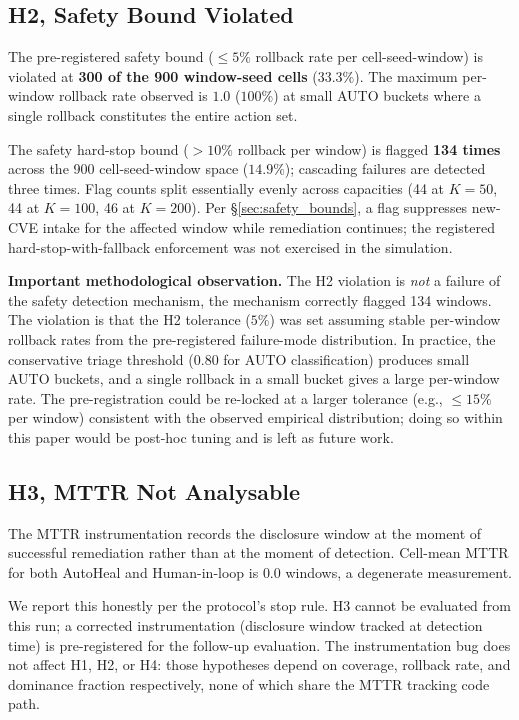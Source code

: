 \subsection{H2, Safety Bound Violated}

The pre-registered safety bound ($\leq 5\%$ rollback rate per
cell-seed-window) is violated at \textbf{300 of the 900
window-seed cells} ($33.3\%$). The maximum per-window rollback
rate observed is $1.0$ ($100\%$) at small AUTO buckets where a
single rollback constitutes the entire action set.

The safety hard-stop bound ($> 10\%$ rollback per window) is
flagged \textbf{134 times} across the 900 cell-seed-window space
($14.9\%$); cascading failures are detected three times.
Flag counts split essentially evenly across capacities (44 at $K = 50$,
44 at $K = 100$, 46 at $K = 200$). Per \S\ref{sec:safety_bounds},
a flag suppresses new-CVE intake for the affected window while
remediation continues; the registered hard-stop-with-fallback
enforcement was not exercised in the simulation.

\textbf{Important methodological observation.} The H2 violation
is \emph{not} a failure of the safety detection mechanism, the
mechanism correctly flagged 134 windows. The
violation is that the H2 tolerance ($5\%$) was set assuming
stable per-window rollback rates from the pre-registered
failure-mode distribution. In practice, the conservative triage
threshold ($0.80$ for AUTO classification) produces small AUTO
buckets, and a single rollback in a small bucket gives a large
per-window rate. The pre-registration could be re-locked at a
larger tolerance (e.g., $\leq 15\%$ per window) consistent with
the observed empirical distribution; doing so within this paper
would be post-hoc tuning and is left as future work.

\subsection{H3, MTTR Not Analysable}

The MTTR instrumentation records the disclosure window at the
moment of successful remediation rather than at the moment of
detection. Cell-mean MTTR for both AutoHeal and Human-in-loop is
$0.0$ windows, a degenerate measurement.

We report this honestly per the protocol's stop rule. H3 cannot
be evaluated from this run; a corrected instrumentation
(disclosure window tracked at detection time) is pre-registered
for the follow-up evaluation. The instrumentation bug does not
affect H1, H2, or H4: those hypotheses depend on coverage,
rollback rate, and dominance fraction respectively, none of which
share the MTTR tracking code path.

